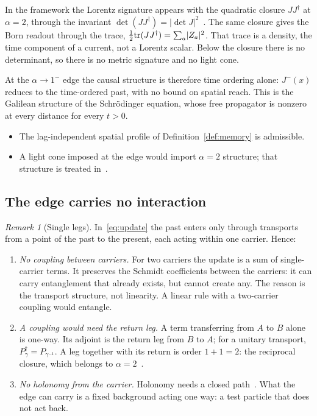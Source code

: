 \documentclass[11pt]{amsart}
\theoremstyle{definition}
\theoremstyle{remark}
\newtheorem{remark}[theorem]{Remark}
\begin{document}
In the framework the Lorentz signature appears with the quadratic closure $JJ^\dagger$ at $\alpha=2$, through the invariant $\det(JJ^\dagger)=\lvert\det J\rvert^2$~\cite{CAL}. The same closure gives the Born readout through the trace, $\tfrac12{\rm tr}(JJ^\dagger)=\sum_a\lvert Z_a\rvert^2$. That trace is a density, the time component of a current, not a Lorentz scalar. Below the closure there is no determinant, so there is no metric signature and no light cone.

At the $\alpha\to1^-$ edge the causal structure is therefore time ordering alone: $J^-(x)$ reduces to the time-ordered past, with no bound on spatial reach. This is the Galilean structure of the Schr\"odinger equation, whose free propagator is nonzero at every distance for every $t>0$.
\begin{itemize}
\item The lag-independent spatial profile of Definition~\ref{def:memory} is admissible.
\item A light cone imposed at the edge would import $\alpha=2$ structure; that structure is treated in~\cite{Alpha2}.
\end{itemize}

\subsection{The edge carries no interaction}\label{sec:nointeraction}

\begin{remark}[Single legs]\label{rem:nointeraction}
In~\eqref{eq:update} the past enters only through transports from a point of the past to the present, each acting within one carrier. Hence:
\begin{enumerate}
\item \emph{No coupling between carriers.} For two carriers the update is a sum of single-carrier terms. It preserves the Schmidt coefficients between the carriers: it can carry entanglement that already exists, but cannot create any. The reason is the transport structure, not linearity. A linear rule with a two-carrier coupling would entangle.
\item \emph{A coupling would need the return leg.} A term transferring from $A$ to $B$ alone is one-way. Its adjoint is the return leg from $B$ to $A$; for a unitary transport, $P_\gamma^\dagger=P_{\gamma^{-1}}$. A leg together with its return is order $1+1=2$: the reciprocal closure, which belongs to $\alpha=2$~\cite{Alpha2}.
\item \emph{No holonomy from the carrier.} Holonomy needs a closed path~\cite{CAL}. What the edge can carry is a fixed background acting one way: a test particle that does not act back.
\end{enumerate}
\end{remark}
\end{document}

